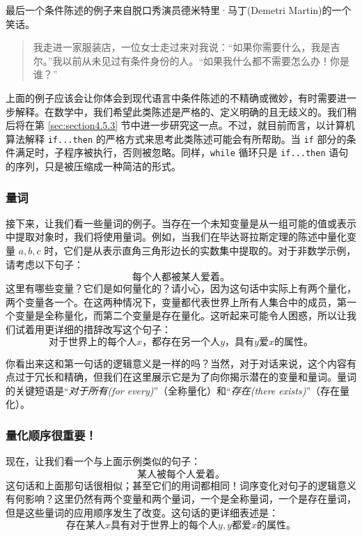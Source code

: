 最后一个条件陈述的例子来自脱口秀演员德米特里·马丁(Demetri Martin)的一个笑话。

\begin{quote}
    我走进一家服装店，一位女士走过来对我说：``如果你需要什么，我是吉尔。''我以前从未见过有条件身份的人。``如果我什么都不需要怎么办！你是谁？''
\end{quote}

上面的例子应该会让你体会到现代语言中条件陈述的不精确或微妙，有时需要进一步解释。在数学中，我们希望此类陈述是严格的、定义明确的且无歧义的。我们稍后将在第 \ref{sec:section4.5.3} 节中进一步研究这一点。不过，就目前而言，以计算机算法解释 \verb|if...then| 的严格方式来思考此类陈述可能会有所帮助。当 \verb|if| 部分的条件满足时，子程序被执行，否则被忽略。同样，\verb|while| 循环只是 \verb|if...then| 语句的序列，只是被压缩成一种简洁的形式。

\subsubsection*{量词}

接下来，让我们看一些量词的例子。当存在一个未知变量是从一组可能的值或表示中提取对象时，我们将使用量词。例如，当我们在毕达哥拉斯定理的陈述中量化变量 $a,b,c$ 时，它们是从表示直角三角形边长的实数集中提取的。对于非数学示例，请考虑以下句子：
\[\text{每个人都被某人爱着。}\]
这里有哪些变量？它们是如何量化的？请小心，因为这句话中实际上有两个量化，两个变量各一个。在这两种情况下，变量都代表世界上所有人集合中的成员，第一个变量是全称量化，而第二个变量是存在量化。这听起来可能令人困惑，所以让我们试着用更详细的措辞改写这个句子：
\[\text{对于世界上的每个人} x\text{，都存在另一个人} y \text{，具有} y \text{爱} x \text{的属性。}\]

你看出来这和第一句话的逻辑意义是一样的吗？当然，对于对话来说，这个内容有点过于冗长和精确，但我们在这里展示它是为了向你揭示潜在的变量和量词。量词的关键短语是``\emph{对于所有(for every)}''（全称量化）和``\emph{存在(there exists)}''（存在量化）。

\subsubsection*{量化顺序很重要！}

现在，让我们看一个与上面示例类似的句子：
\[\text{某人被每个人爱着。}\]
这句话和上面那句话很相似；甚至它们的用词都相同！词序变化对句子的逻辑意义有何影响？这里仍然有两个变量和两个量词，一个是全称量词，一个是存在量词，但是这些量词的应用顺序发生了改变。这句话的更详细表述是：
\[\text{存在某人} x \text{具有对于世界上的每个人} y, y \text{都爱} x \text{的属性。}\]

